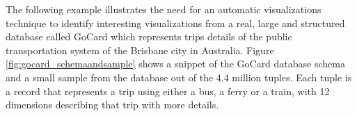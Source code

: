 The following example illustrates the need for an automatic visualizations technique to identify interesting visualizations from a real, large and structured database called GoCard which represents trips details of the public transportation system of the Brisbane city in Australia.
%
Figure \ref{fig:gocard_schemaandsample} shows a snippet of the GoCard database schema and a small sample from the database out of the 4.4 million tuples.
%
Each tuple is a record that represents a trip using either a bus, a ferry or a train, with 12 dimensions describing that trip with more details.
%
%
%
%
%
%
%
%

